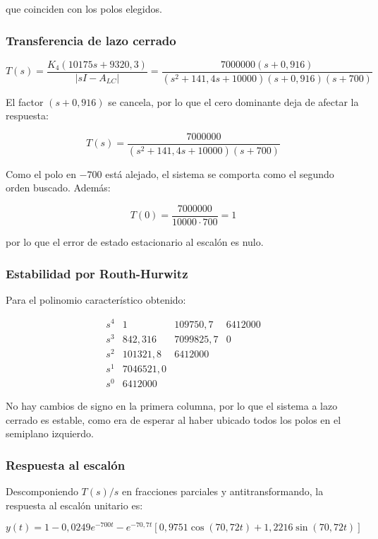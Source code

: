 \documentclass[12pt,a4paper]{article}
\begin{document}
que coinciden con los polos elegidos.
\subsubsection*{Transferencia de lazo cerrado}
\begin{equation}T(s)=\frac{K_4(10175s+9320{,}3)}{|sI-A_{LC}|}=\frac{7000000(s+0{,}916)}{(s^2+141{,}4s+10000)(s+0{,}916)(s+700)}\end{equation}

El factor $(s+0{,}916)$ se cancela, por lo que el cero dominante deja de afectar la respuesta:

\begin{equation}\boxed{T(s)=\frac{7000000}{(s^2+141{,}4s+10000)(s+700)}}\end{equation}

Como el polo en $-700$ está alejado, el sistema se comporta como el segundo orden buscado. Además:

\begin{equation}T(0)=\frac{7000000}{10000\cdot700}=1\end{equation}

por lo que el error de estado estacionario al escalón es nulo.
\subsubsection*{Estabilidad por Routh-Hurwitz}
Para el polinomio característico obtenido:

\begin{equation}\begin{array}{c|ccc}s^4&1&109750{,}7&6412000\\s^3&842{,}316&7099825{,}7&0\\s^2&101321{,}8&6412000&\\s^1&7046521{,}0&&\\s^0&6412000&&\end{array}\end{equation}

No hay cambios de signo en la primera columna, por lo que el sistema a lazo cerrado es estable, como era de esperar al haber ubicado todos los polos en el semiplano izquierdo.
\subsubsection*{Respuesta al escalón}
Descomponiendo $T(s)/s$ en fracciones parciales y antitransformando, la respuesta al escalón unitario es:

\begin{equation}\boxed{y(t)=1-0{,}0249e^{-700t}-e^{-70{,}7t}\left[0{,}9751\cos(70{,}72t)+1{,}2216\sin(70{,}72t)\right]}\end{equation}
\end{document}
